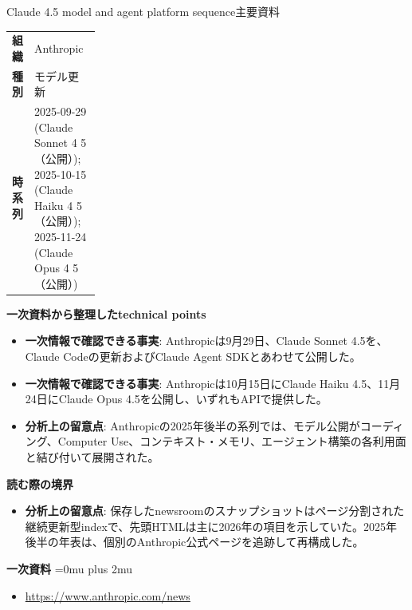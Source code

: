 \begin{technicalnote}{Claude 4.5 model and agent platform sequence}{主要資料}
\begingroup
\begin{tabularx}{\linewidth}{@{}>{\bfseries}p{0.22\linewidth}X@{}}
組織 & Anthropic \\
種別 & モデル更新 \\
時系列 & 2025-09-29 (Claude Sonnet 4 5（公開）); 2025-10-15 (Claude Haiku 4 5（公開）); 2025-11-24 (Claude Opus 4 5（公開）) \\
\end{tabularx}
\smallskip
{\bfseries 一次資料から整理したtechnical points}
\begin{itemize}[leftmargin=1.5em,itemsep=0.35em]
\item \textbf{一次情報で確認できる事実}: Anthropicは9月29日、Claude Sonnet 4.5を、Claude Codeの更新およびClaude Agent SDKとあわせて公開した。
\item \textbf{一次情報で確認できる事実}: Anthropicは10月15日にClaude Haiku 4.5、11月24日にClaude Opus 4.5を公開し、いずれもAPIで提供した。
\item \textbf{分析上の留意点}: Anthropicの2025年後半の系列では、モデル公開がコーディング、Computer Use、コンテキスト・メモリ、エージェント構築の各利用面と結び付いて展開された。
\end{itemize}
\begin{minipage}{\linewidth}
{\bfseries 読む際の境界}
\begin{itemize}[leftmargin=1.5em,itemsep=0.35em]
\item \textbf{分析上の留意点}: 保存したnewsroomのスナップショットはページ分割された継続更新型indexで、先頭HTMLは主に2026年の項目を示していた。2025年後半の年表は、個別のAnthropic公式ページを追跡して再構成した。
\end{itemize}
\begin{samepage}
{\bfseries 一次資料}
\begingroup\sloppy
\Urlmuskip=0mu plus 2mu\relax
\begin{itemize}[leftmargin=1.5em,itemsep=0.25em]
\item {\scriptsize\url{https://www.anthropic.com/news}}
\end{itemize}
\endgroup
\end{samepage}
\end{minipage}
\endgroup
\end{technicalnote}
\medskip

